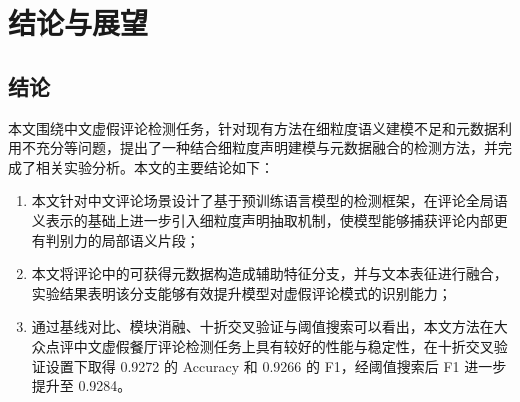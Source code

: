 \documentclass[UTF8,oneside,openright,fontset=none]{ctexbook}
\numberwithin{equation}{chapter}
\begin{document}
\chapter{结论与展望}

\section{结论}
本文围绕中文虚假评论检测任务，针对现有方法在细粒度语义建模不足和元数据利用不充分等问题，提出了一种结合细粒度声明建模与元数据融合的检测方法，并完成了相关实验分析。本文的主要结论如下：
\begin{enumerate}
  \item 本文针对中文评论场景设计了基于预训练语言模型的检测框架，在评论全局语义表示的基础上进一步引入细粒度声明抽取机制，使模型能够捕获评论内部更有判别力的局部语义片段；
  \item 本文将评论中的可获得元数据构造成辅助特征分支，并与文本表征进行融合，实验结果表明该分支能够有效提升模型对虚假评论模式的识别能力；
  \item 通过基线对比、模块消融、十折交叉验证与阈值搜索可以看出，本文方法在大众点评中文虚假餐厅评论检测任务上具有较好的性能与稳定性，在十折交叉验证设置下取得 0.9272 的 Accuracy 和 0.9266 的 F1，经阈值搜索后 F1 进一步提升至 0.9284。
\end{enumerate}
\end{document}
